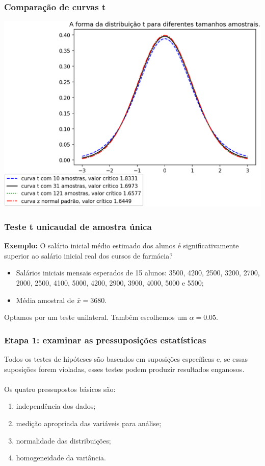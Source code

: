 \documentclass[11pt]{beamer}
\begin{document}
\begin{frame}
\frametitle{Comparação de curvas t}

\begin{center}\includegraphics[width=0.8\linewidth]{figs/comp_curvas_t.png} \end{center}

\end{frame}


\begin{frame}
\frametitle{Teste t unicaudal de amostra única}

\textbf{Exemplo:} O salário inicial médio estimado dos alunos é significativamente superior ao salário inicial real dos cursos de farmácia?

\begin{itemize}
\item
   Salários iniciais mensais esperados de 15 alunos: 3500, 4200, 2500, 3200, 2700, 2000, 2500, 4100, 5000, 4200, 2900, 3900, 4000, 5000 e 5500;
\item
  Média amostral de $\bar{x} = 3680$.
\end{itemize}

Optamos por um teste unilateral. Também escolhemos um \(\alpha=0.05\).

\end{frame}

\begin{frame}
\frametitle{Etapa 1: examinar as pressuposições estatísticas}

Todos os testes de hipóteses são baseados em suposições específicas e, se essas suposições forem violadas, esses testes podem produzir resultados enganosos.\\~\\
Os quatro pressupostos básicos são:

\begin{enumerate}
\item independência dos dados;
\item medição apropriada das variáveis para análise;
\item normalidade das distribuições;
\item homogeneidade da variância.
\end{enumerate}

\end{frame}
\end{document}
